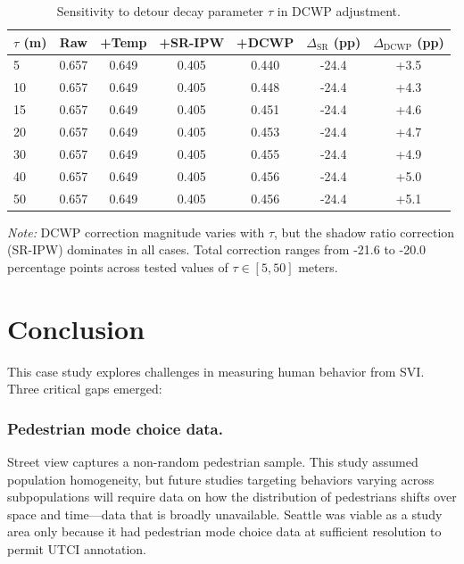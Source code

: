 \documentclass{ifacconf}
\begin{document}
\begin{table}[t!]
\centering
\caption{Sensitivity to detour decay parameter $\tau$ in DCWP adjustment.}
\label{tab:sensitivity-tau}
\small
\begin{tabular}{@{}lcccccc@{}}
\toprule
$\tau$ (m) & Raw & +Temp & +SR-IPW & +DCWP & $\Delta_{\text{SR}}$ (pp) & $\Delta_{\text{DCWP}}$ (pp) \\
\midrule
 5 & 0.657 & 0.649 & 0.405 & 0.440 & -24.4 & +3.5 \\
10 & 0.657 & 0.649 & 0.405 & 0.448 & -24.4 & +4.3 \\
15 & 0.657 & 0.649 & 0.405 & 0.451 & -24.4 & +4.6 \\
20 & 0.657 & 0.649 & 0.405 & 0.453 & -24.4 & +4.7 \\
30 & 0.657 & 0.649 & 0.405 & 0.455 & -24.4 & +4.9 \\
40 & 0.657 & 0.649 & 0.405 & 0.456 & -24.4 & +5.0 \\
50 & 0.657 & 0.649 & 0.405 & 0.456 & -24.4 & +5.1 \\
\bottomrule
\end{tabular}
\vspace{2pt}
\parbox{0.9\linewidth}{\footnotesize
\textit{Note:} DCWP correction magnitude varies with $\tau$, but the shadow ratio correction (SR-IPW) dominates in all cases. Total correction ranges from -21.6 to -20.0 percentage points across tested values of $\tau \in [5, 50]$ meters.
}
\end{table}
 
  \section{Conclusion}
  \label{sec:Conclusion}

  This case study explores challenges in measuring human behavior
  from SVI. Three critical gaps emerged:

  \subsubsection{Pedestrian mode choice data.} Street view captures a
  non-random pedestrian sample. This study assumed population
  homogeneity, but future studies targeting behaviors varying across subpopulations
   will require data on how the distribution of pedestrians shifts over space and time---data that is broadly unavailable. Seattle was viable as a study area only because it had pedestrian mode choice data at sufficient resolution to permit UTCI annotation. 
\end{document}
